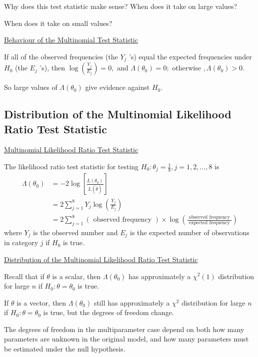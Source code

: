 Why does this test statistic make sense? When does it take on large values?

When does it take on small values?

\underline{Behaviour of the Multinomial Test Statistic}

If all of the observed frequencies (the $Y_{j}$ 's) equal the expected frequencies
under $H_{0}$ (the $E_{j}$ 's), then $\log \left(\frac{Y_{j}}{E_{j}}\right)=0,$
and $\Lambda\left(\theta_{0}\right)=0 ;$ otherwise $, \Lambda\left(\theta_{0}\right)>0$.

So large values of $\Lambda\left(\theta_{0}\right)$ give evidence against $H_{0}$.

\subsection{Distribution of the Multinomial Likelihood Ratio Test Statistic}
\underline{Multinomial Likelihood Ratio Test Statistic}

The likelihood ratio test statistic for testing $H_{0}: \theta_{j}=\frac{1}{8}, j=1,2, \ldots, 8$ is
\[
    \begin{aligned}
        \Lambda\left(\theta_{0}\right) & =-2 \log \left[\frac{L\left(\theta_{0}\right)}{L(\tilde{\theta})}\right]                              \\
                                       & =2 \sum_{j=1}^{8} Y_{j} \log \left(\frac{Y_{j}}{E_{j}}\right)                                         \\
                                       & =2 \sum_{j=1}^{8}(\text { observed frequency }) \times \log \left(\frac{\text { observed frequency }}
        {\text { expected frequency }}\right)
    \end{aligned}
\]
where $Y_{j}$ is the observed number and $E_{j}$ is the expected number of observations
in category $j$ if $H_{0}$ is true.

\underline{Distribution of the Multinomial Likelihood Ratio Test Statistic}

Recall that if $\theta$ is a scalar, then $\Lambda\left(\theta_{0}\right)$ has approximately
a $\chi^{2}(1)$ distribution for large $n$ if $H_{0}: \theta=\theta_{0}$ is true.

If $\theta$ is a vector, then $\Lambda\left(\theta_{0}\right)$ still has approximately a $\chi^{2}$
distribution for large $n$ if $H_{0}: \theta=\theta_{0}$ is true, but the degrees of freedom change.

The degrees of freedom in the multiparameter case depend on both how many parameters are unknown in
the original model, and how many parameters must be estimated under the null hypothesis.


